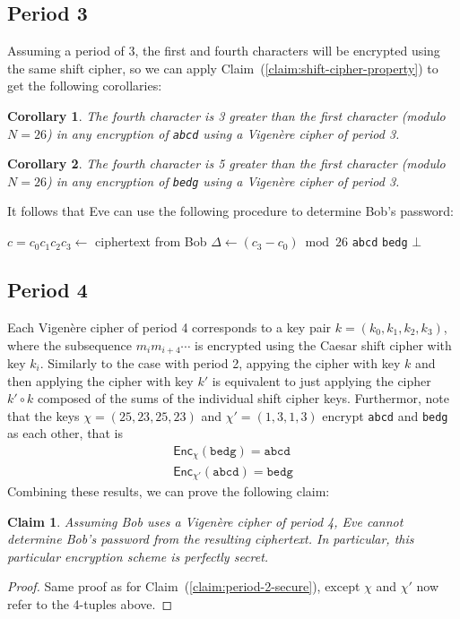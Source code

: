 \documentclass[12pt]{article}
\numberwithin{equation}{section}
\theoremstyle{plain}
\newtheorem{claim}{Claim}
\newtheorem{corollary}{Corollary}
\newcommand{\algo}[1]{\mathsf{#1}}
\newcommand{\enc}{\algo{Enc}}
\begin{document}
\subsection*{Period 3}

Assuming a period of 3,
the first and fourth characters will be encrypted using the same shift cipher,
so we can apply Claim~(\ref{claim:shift-cipher-property}) to get the following corollaries:
\begin{corollary}
The fourth character is 3 greater than the first character (modulo $N = 26$) in any encryption
of \texttt{abcd} using a Vigen\`ere cipher of period 3.
\end{corollary}
\begin{corollary}
The fourth character is 5 greater than the first character (modulo $N = 26$) in any encryption
of \texttt{bedg} using a Vigen\`ere cipher of period 3.
\end{corollary}
It follows that Eve can use the following procedure to determine Bob's password:
\begin{algorithm}[H]
\begin{algorithmic}
    \State $c = c_0c_1c_2c_3 \gets$ ciphertext from Bob
    \State $\Delta \gets (c_3 - c_0) \bmod 26$
        \State \Return \texttt{abcd}
        \State \Return \texttt{bedg}
    \Else
        \State \Return $\bot$
    \EndIf
\EndProcedure
\end{algorithmic}
\end{algorithm}

\subsection*{Period 4}

Each Vigen\`ere cipher of period 4 corresponds to a key pair $k = (k_0, k_1, k_2, k_3)$,
where the subsequence $m_im_{i+4}\cdots$
is encrypted using the Caesar shift cipher with key $k_i$.
Similarly to the case with period 2, appying the cipher with key $k$
and then applying the cipher with key $k'$
is equivalent to just applying the cipher $k' \circ k$
composed of the sums of the individual shift cipher keys.
Furthermor, note that the keys
$\chi = (25, 23, 25, 23)$ and $\chi' = (1, 3, 1, 3)$
encrypt \texttt{abcd} and \texttt{bedg} as each other, that is
\begin{gather*}
    \enc_{\chi}(\texttt{bedg}) = \texttt{abcd}\\
    \enc_{\chi'}(\texttt{abcd}) = \texttt{bedg}
\end{gather*}
Combining these results, we can prove the following claim:
\begin{claim}\label{claim:period-4-secure}
Assuming Bob uses a Vigen\`ere cipher of period 4,
Eve cannot determine Bob's password from the resulting ciphertext.
In particular, this particular encryption scheme is perfectly secret.
\end{claim}
\begin{proof}
Same proof as for Claim~(\ref{claim:period-2-secure}),
except $\chi$ and $\chi'$ now refer to the 4-tuples above.
\end{proof}
\end{document}
